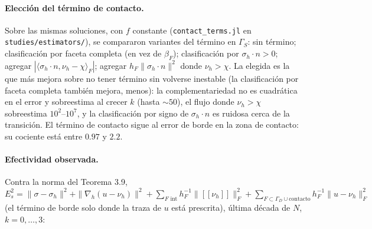\documentclass[11pt,a4paper]{article}
\newcommand{\code}[1]{\texttt{#1}}
\begin{document}
\paragraph{Elección del término de contacto.} {\sloppy Sobre las mismas soluciones, con $f$ constante
(\code{contact\_terms.jl} en \code{studies/estimators/}), se compararon variantes del término en $\Gamma_S$:
sin término; clasificación por faceta completa (en vez de $\beta_F$); clasificación por
$\sigma_h\cdot n>0$; agregar $|\langle\sigma_h\cdot n,\nu_h-\chi\rangle_F|$; agregar
$h_F\|\sigma_h\cdot n\|^2$ donde $\nu_h>\chi$. La elegida es la que más mejora sobre no tener
término sin volverse inestable (la clasificación por faceta completa también mejora, menos): la
complementariedad no es cuadrática en el error y sobreestima al crecer $k$ (hasta $\sim\!50$), el
flujo donde $\nu_h>\chi$ sobreestima $10^2$--$10^7$, y la clasificación por signo de
$\sigma_h\cdot n$ es ruidosa cerca de la transición. El término de contacto sigue al error de
borde en la zona de contacto: su cociente está entre $0.97$ y $2.2$.\par}

\paragraph{Efectividad observada.} Contra la norma del Teorema 3.9,
$E_s^2=\|\sigma-\sigma_h\|^2+\|\nabla_h(u-\nu_h)\|^2+\sum_{F\text{ int}}h_F^{-1}\|[\![\nu_h]\!]\|_F^2
+\sum_{F\subset\Gamma_D\cup\text{contacto}}h_F^{-1}\|u-\nu_h\|_F^2$ (el término de borde solo donde
la traza de $u$ está prescrita), última década de $N$, $k=0,\dots,3$:
\end{document}
